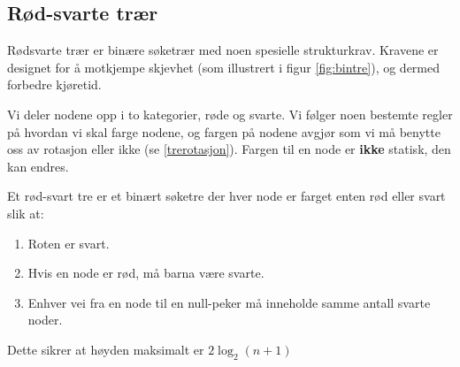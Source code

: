 \subsection{Rød-svarte trær}
Rødsvarte trær er binære søketrær med noen spesielle strukturkrav. Kravene er designet for å motkjempe skjevhet (som illustrert i figur \ref{fig:bintre}), og dermed forbedre kjøretid.

Vi deler nodene opp i to kategorier, røde og svarte. Vi følger noen bestemte regler på hvordan vi skal farge nodene, og fargen på nodene avgjør som vi må benytte oss av rotasjon eller ikke (se \ref{trerotasjon}). Fargen til en node er \textbf{ikke} statisk, den kan endres.

\begin{definisjon}
\label{def:rb_tree}
Et rød-svart tre er et binært søketre der hver node er
farget enten rød eller svart slik at:
\begin{enumerate}[i]
\item Roten er svart.
\item Hvis en node er rød, må barna være svarte.
\item Enhver vei fra en node til en null-peker må inneholde samme antall svarte noder.
\end{enumerate}
\end{definisjon}

Dette sikrer at høyden maksimalt er $ 2\log_2 (n+1) $


